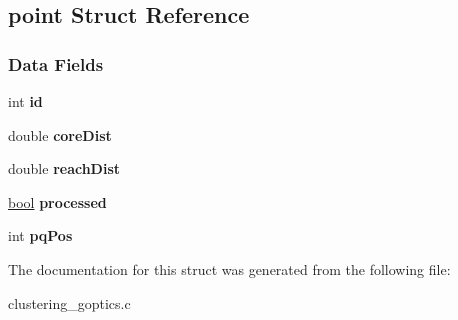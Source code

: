 \hypertarget{structpoint}{}\subsection{point Struct Reference}
\label{structpoint}
\subsubsection*{Data Fields}
\begin{DoxyCompactItemize}
\item 
\mbox{\label{structpoint_a5923982f66809b9bdde4d14fc7939259}} 
int {\bfseries id}
\item 
\mbox{\label{structpoint_ae2bc8ca43bce7bbe5520aa7aa1139f1d}} 
double {\bfseries core\+Dist}
\item 
\mbox{\label{structpoint_a8d2201adcc02ecc543776c0a7befc06b}} 
double {\bfseries reach\+Dist}
\item 
\mbox{\label{structpoint_ae7ee439185943af4d6b9a0ead57ecc9a}} 
\hyperlink{lowlevel_8h_a97a80ca1602ebf2303258971a2c938e2}{bool} {\bfseries processed}
\item 
\mbox{\label{structpoint_a9d3ff9e10bcfd9c5f76ca5c9666cbea5}} 
int {\bfseries pq\+Pos}
\end{DoxyCompactItemize}


The documentation for this struct was generated from the following file\+:\begin{DoxyCompactItemize}
\item 
clustering\+\_\+goptics.\+c\end{DoxyCompactItemize}
